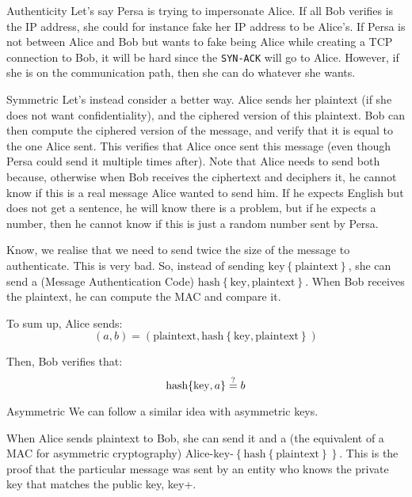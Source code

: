 \documentclass[a4paper]{article}
\begin{document}
\begin{parag}{Authenticity}
    Let's say Persa is trying to impersonate Alice. If all Bob verifies is the IP address, she could for instance fake her IP address to be Alice's. If Persa is not between Alice and Bob but wants to fake being Alice while creating a TCP connection to Bob, it will be hard since the \texttt{SYN-ACK} will go to Alice. However, if she is on the communication path, then she can do whatever she wants.

    \begin{subparag}{Symmetric}
        Let's instead consider a better way. Alice sends her plaintext (if she does not want confidentiality), and the ciphered version of this plaintext. Bob can then compute the ciphered version of the message, and verify that it is equal to the one Alice sent. This verifies that Alice once sent this message (even though Persa could send it multiple times after). Note that Alice needs to send both because, otherwise when Bob receives the ciphertext and deciphers it, he cannot know if this is a real message Alice wanted to send him. If he expects English but does not get a sentence, he will know there is a problem, but if he expects a number, then he cannot know if this is just a random number sent by Persa. 

        Know, we realise that we need to send twice the size of the message to authenticate. This is very bad. So, instead of sending $\text{key}\left\{\text{plaintext}\right\}$, she can send a  (Message Authentication Code) $\text{hash}\left\{\text{key}, \text{plaintext}\right\}$. When Bob receives the plaintext, he can compute the MAC and compare it.

        To sum up, Alice sends: 
        \[\left(a, b\right) = \left(\text{plaintext}, \text{hash}\left\{\text{key}, \text{plaintext}\right\}\right)\]
        
        Then, Bob verifies that: 
        \[\text{hash}\left\{\text{key}, a\right\} \over{=}{?}  b\]
    \end{subparag}
    

    \begin{subparag}{Asymmetric}
        We can follow a similar idea with asymmetric keys.

        When Alice sends plaintext to Bob, she can send it and a  (the equivalent of a MAC for asymmetric cryptography) $\text{Alice-key-}\left\{\text{hash}\left\{\text{plaintext}\right\}\right\}$. This is the proof that the particular message was sent by an entity who knows the private key that matches the public key, key+.


\end{subparag}
\end{parag}
\end{document}
